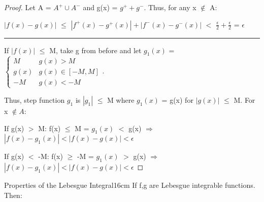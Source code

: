 \begin{proof}
        Let A = $A^+ \cup A^-$ and g(x) = $g^+ + g^-$.
        Thus, for any x $\not \in$ A:

        \hspace{0.5cm}
        $|f(x) - g(x)|$
        $\leq$ $|f^+(x) - g^+(x)| + |f^-(x) - g^-(x)|$
        $<$ $\frac{\epsilon}{2} + \frac{\epsilon}{2}$
        = $\epsilon$

        \rule[0.1cm]{16.7cm}{0.01cm}

        If $|f(x)|$ $\leq$ M, take g from before and let
        $g_1(x)$ =
        $\begin{cases}
            M & g(x) > M \\
            g(x) & g(x) \in [-M,M] \\
            -M & g(x) < -M
        \end{cases}$.

        Thus, step function $g_1$ is $|g_1|$ $\leq$ M
        where $g_1(x)$ = g(x) for $|g(x)|$ $\leq$ M. For x $\not \in A$:

        \hspace{0.2cm}
        If g(x) $>$ M:
        \hspace{0.5cm}
        f(x) $\leq$ M = $g_1(x)$ $<$ g(x)
        \hspace{0.2cm}
        $\Rightarrow$
        \hspace{0.2cm}
        $|f(x) - g_1(x)| < |f(x) - g(x)| < \epsilon$

        \hspace{0.25cm}
        If g(x) $<$ -M:
        \hspace{0.4cm}
        f(x) $\geq$ -M = $g_1(x)$ $>$ g(x)
        \hspace{0.2cm}
        $\Rightarrow$
        \hspace{0.2cm}
        $|f(x) - g_1(x)| < |f(x) - g(x)| < \epsilon$
    \end{proof}

    \newpage



    \begin{wtheorem}{Properties of the Lebesgue Integral}{16cm}
        If f,g are Lebesgue integrable functions. Then:
    \end{wtheorem}

